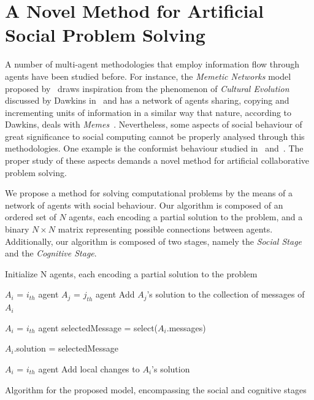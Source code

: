 \documentclass{article}
\begin{document}
\section{A Novel Method for Artificial Social Problem Solving}

A number of multi-agent methodologies that employ information flow through agents have been studied before. For instance, the {\em Memetic Networks} model proposed by~\cite{araujo:memenet} draws inspiration from the phenomenon of {\em Cultural Evolution} discussed by Dawkins in~\cite{dawkins:selfishgene} and has a network of agents sharing, copying and incrementing units of information in a similar way that nature, according to Dawkins, deals with {\em Memes}~\cite{dawkins:selfishgene}. Nevertheless, some aspects of social behaviour of great significance to social computing cannot be properly analysed through this methodologies. One example is the conformist behaviour studied in~\cite{cefferson:conformists} and~\cite{farenzena:collabem}. The proper study of these aspects demands a novel method for artificial collaborative problem solving.

We propose a method for solving computational problems by the means of a network of agents with social behaviour. Our algorithm is composed of an ordered set of $N$ agents, each encoding a partial solution to the problem, and a binary $N \times N$ matrix representing possible connections between agents. Additionally, our algorithm is composed of two stages, namely the {\em Social Stage} and the {\em Cognitive Stage}. 

\begin{algorithm}
 \SetAlgoLined
 Initialize N agents, each encoding a partial solution to the problem\;
 {
 	{
 		{
 			{
 				$A_{i}$ = $i_{th}$ agent\;
 				$A_{j}$ = $j_{th}$ agent\;
 				Add $A_{j}$'s solution to the collection of messages of $A_{i}$\; %
 			}
 		}
 	}
 	{
 		\;
 		$A_{i}$ = $i_{th}$ agent\;
 		selectedMessage = select($A_{i}$.messages)\;
 		
 		{
 			$A_{i}$.solution = selectedMessage\;
 		}
 	}
 	{
 		\;
 		$A_{i}$ = $i_{th}$ agent\;
 		Add local changes to $A_{i}$'s solution%
 	}
 }
 \caption{Algorithm for the proposed model, encompassing the social and cognitive stages}
\end{algorithm}
\end{document}
